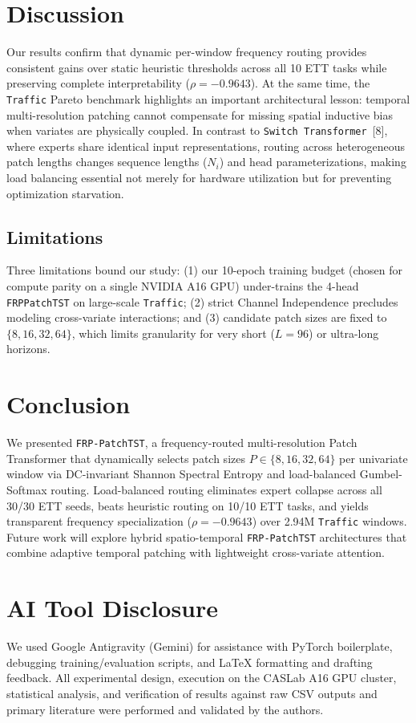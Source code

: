 \documentclass[11pt, letterpaper]{article}
\begin{document}
\section{Discussion}

Our results confirm that dynamic per-window frequency routing provides consistent gains over static heuristic thresholds across all 10 ETT tasks while preserving complete interpretability ($\rho = -0.9643$). At the same time, the \texttt{Traffic} Pareto benchmark highlights an important architectural lesson: temporal multi-resolution patching cannot compensate for missing spatial inductive bias when variates are physically coupled. In contrast to \texttt{Switch Transformer}~[8], where experts share identical input representations, routing across heterogeneous patch lengths changes sequence lengths ($N_i$) and head parameterizations, making load balancing essential not merely for hardware utilization but for preventing optimization starvation.

\subsection{Limitations}
Three limitations bound our study: (1) our 10-epoch training budget (chosen for compute parity on a single NVIDIA A16 GPU) under-trains the 4-head \texttt{FRPPatchTST} on large-scale \texttt{Traffic}; (2) strict Channel Independence precludes modeling cross-variate interactions; and (3) candidate patch sizes are fixed to $\{8, 16, 32, 64\}$, which limits granularity for very short ($L=96$) or ultra-long horizons.

\section{Conclusion}

We presented \texttt{FRP-PatchTST}, a frequency-routed multi-resolution Patch Transformer that dynamically selects patch sizes $P \in \{8, 16, 32, 64\}$ per univariate window via DC-invariant Shannon Spectral Entropy and load-balanced Gumbel-Softmax routing. Load-balanced routing eliminates expert collapse across all 30/30 ETT seeds, beats heuristic routing on 10/10 ETT tasks, and yields transparent frequency specialization ($\rho = -0.9643$) over 2.94M \texttt{Traffic} windows. Future work will explore hybrid spatio-temporal \texttt{FRP-PatchTST} architectures that combine adaptive temporal patching with lightweight cross-variate attention.

\section{AI Tool Disclosure}
We used Google Antigravity (Gemini) for assistance with PyTorch boilerplate, debugging training/evaluation scripts, and LaTeX formatting and drafting feedback. All experimental design, execution on the CASLab A16 GPU cluster, statistical analysis, and verification of results against raw CSV outputs and primary literature were performed and validated by the authors.
\end{document}
